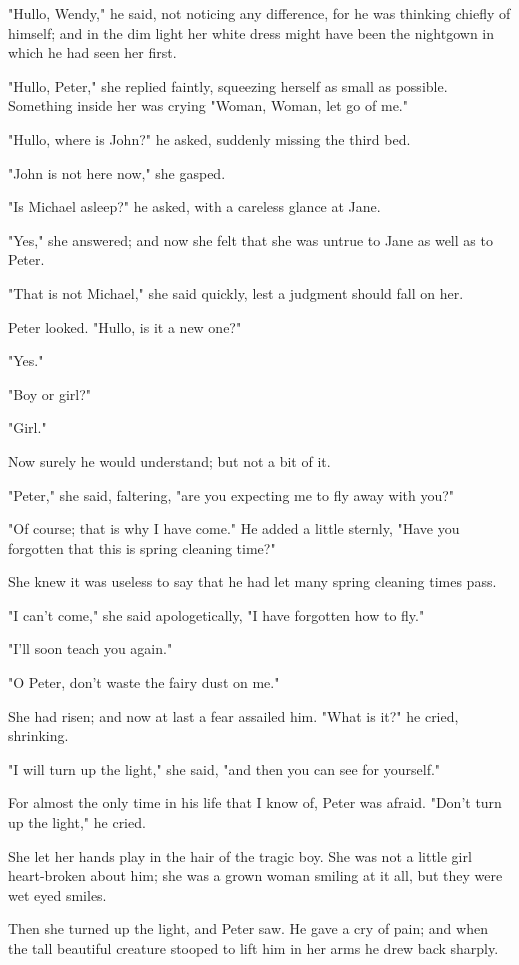 "Hullo, Wendy," he said, not noticing any difference, for he was thinking
chiefly of himself; and in the dim light her white dress might have been
the nightgown in which he had seen her first.


"Hullo, Peter," she replied faintly, squeezing herself as small as
possible. Something inside her was crying "Woman, Woman, let go of me."


"Hullo, where is John?" he asked, suddenly missing the third bed.


"John is not here now," she gasped.


"Is Michael asleep?" he asked, with a careless glance at Jane.


"Yes," she answered; and now she felt that she was untrue to Jane as well
as to Peter.


"That is not Michael," she said quickly, lest a judgment should fall on
her.


Peter looked. "Hullo, is it a new one?"


"Yes."


"Boy or girl?"


"Girl."


Now surely he would understand; but not a bit of it.


"Peter," she said, faltering, "are you expecting me to fly away with you?"


"Of course; that is why I have come." He added a little sternly, "Have you
forgotten that this is spring cleaning time?"


She knew it was useless to say that he had let many spring cleaning times
pass.


"I can't come," she said apologetically, "I have forgotten how to fly."


"I'll soon teach you again."


"O Peter, don't waste the fairy dust on me."


She had risen; and now at last a fear assailed him. "What is it?" he
cried, shrinking.


"I will turn up the light," she said, "and then you can see for yourself."


For almost the only time in his life that I know of, Peter was afraid.
"Don't turn up the light," he cried.


She let her hands play in the hair of the tragic boy. She was not a little
girl heart-broken about him; she was a grown woman smiling at it all, but
they were wet eyed smiles.


Then she turned up the light, and Peter saw. He gave a cry of pain; and
when the tall beautiful creature stooped to lift him in her arms he drew
back sharply.


